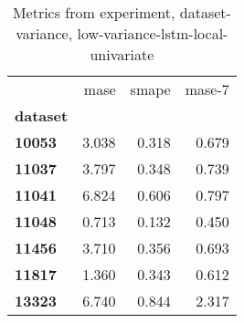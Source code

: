 \begin{table}[h]
\centering
\caption{Metrics from experiment, dataset-variance, low-variance-lstm-local-univariate}
\label{table:low-variance-lstm-local-univariate-dataset-variance}
\begin{tabular}{lrrr}
\toprule
{} &   mase &  smape &  mase-7 \\
\textbf{dataset} &        &        &         \\
\midrule
\textbf{10053  } &  3.038 &  0.318 &   0.679 \\
\textbf{11037  } &  3.797 &  0.348 &   0.739 \\
\textbf{11041  } &  6.824 &  0.606 &   0.797 \\
\textbf{11048  } &  0.713 &  0.132 &   0.450 \\
\textbf{11456  } &  3.710 &  0.356 &   0.693 \\
\textbf{11817  } &  1.360 &  0.343 &   0.612 \\
\textbf{13323  } &  6.740 &  0.844 &   2.317 \\
\bottomrule
\end{tabular}
\end{table}
